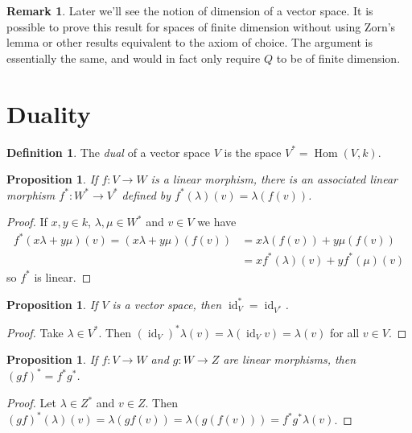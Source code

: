 \documentclass[11pt]{article}
\newtheorem{prop}[theo]{Proposition}
\theoremstyle{definition}
\newtheorem{defi}[theo]{Definition}
\newtheorem*{rema}{Remark}
\DeclareMathOperator{\Hom}{Hom}
\DeclareMathOperator{\id}{id}
\begin{document}
\begin{rema}
Later we'll see the notion of dimension of a vector space.
It is possible to prove this result for spaces of finite dimension without using Zorn's lemma or other results equivalent to the axiom of choice.
The argument is essentially the same, and would in fact only require $Q$ to be of finite dimension.
\end{rema}




\section{Duality}


\begin{defi}
The \emph{dual} of a vector space $V$ is the space $V^* = \Hom(V,k)$.
\end{defi}

\begin{prop}
If $f : V \to W$ is a linear morphism, there is an associated linear morphism $f^* : W^* \to V^*$ defined by $f^*(\lambda)(v) = \lambda(f(v))$.
\end{prop}

\begin{proof}
If $x,y \in k$, $\lambda, \mu \in W^*$ and $v \in V$ we have
\begin{align*}
f^*(x \lambda + y \mu)(v)
= (x \lambda + y \mu)(f(v))
&= x \lambda(f(v)) + y \mu(f(v))
\\
&= x f^*(\lambda)(v) + y f^*(\mu)(v)
\end{align*}
so $f^*$ is linear.
\end{proof}


\begin{prop}
If $V$ is a vector space, then $\id_V^* = \id_{V^*}$.
\end{prop}

\begin{proof}
Take $\lambda \in V^*$. Then $(\id_V)^* \lambda(v) = \lambda(\id_V v) = \lambda(v)$ for all $v \in V$.
\end{proof}


\begin{prop}
If $f : V \to W$ and $g : W \to Z$ are linear morphisms, then $(gf)^* = f^* g^*$.
\end{prop}

\begin{proof}
Let $\lambda \in Z^*$ and $v \in Z$.
Then $(gf)^*(\lambda)(v) = \lambda(gf(v)) = \lambda(g(f(v))) = f^* g^* \lambda(v)$.
\end{proof}
\end{document}
